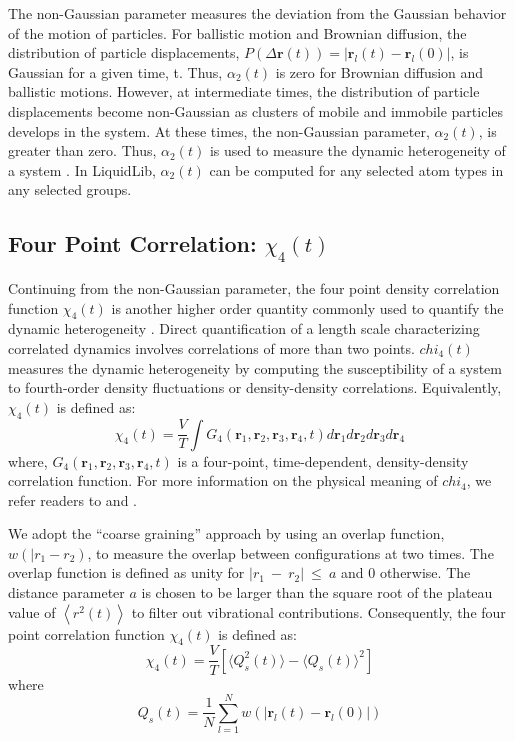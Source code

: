 \documentclass{article}
\begin{document}
The non-Gaussian parameter measures the deviation from the Gaussian behavior of the motion of particles. For ballistic motion and Brownian diffusion, the distribution of particle displacements, $P(\Delta \mathbf{r}(t)) = \left|\mathbf{r}_l(t) - \mathbf{r}_l(0)\right|$, is Gaussian for a given time, t. Thus, $\alpha_2(t)$ is zero for Brownian diffusion and ballistic motions. However, at intermediate times, the distribution of particle displacements become non-Gaussian as clusters of mobile and immobile particles develops in the system. At these times, the non-Gaussian parameter, $\alpha_2(t)$, is greater than zero. Thus, $\alpha_2(t)$ is used to measure the dynamic heterogeneity of a system \cite{Stillinger2005}. In LiquidLib, $\alpha_2(t)$ can be computed for any selected atom types in any selected groups.
 
\subsection{Four Point Correlation: $\chi_4(t)$} \label{sec::chi4}
Continuing from the non-Gaussian parameter, the four point density correlation function $\chi_4(t)$ is another higher order quantity commonly used to quantify the dynamic heterogeneity \cite{chi4}. Direct quantification of a length scale characterizing correlated dynamics involves correlations of more than two points. $chi_4(t)$ measures the dynamic heterogeneity by computing the susceptibility of a system to fourth-order density fluctuations or density-density correlations. Equivalently, $\chi_4(t)$ is defined as:
\begin{equation}
	\chi_4(t) = \frac{V}{T}\int G_4(\mathbf{r}_1, \mathbf{r}_2, \mathbf{r}_3, \mathbf{r}_4, t) d\mathbf{r}_1 d\mathbf{r}_2 d\mathbf{r}_3 d\mathbf{r}_4 
\end{equation}
where, $G_4(\mathbf{r}_1, \mathbf{r}_2, \mathbf{r}_3, \mathbf{r}_4, t)$ is a four-point, time-dependent, density-density correlation function. For more information on the physical meaning of $chi_4$, we refer readers to \cite{chi4} and \cite{Glotzer2000}.

We adopt the ``coarse graining'' approach \cite{chi4} by using an overlap function, $w(|r_1-r_2)$, to measure the overlap between configurations at two times. The overlap function is defined as unity for $|r_1~-~r_2|~\leq~a$ and 0 otherwise. The distance parameter $a$ is chosen to be larger than the square root of the plateau value of $\left<r^2(t)\right>$ to filter out vibrational contributions. Consequently, the four point correlation function $\chi_4(t)$ is defined as:
\begin{equation}
	\label{eq:chi4}
	\chi_4(t) = \frac{V}{T}[\langle Q_s^2(t)\rangle - \langle Q_s(t)\rangle^2]
\end{equation}
where 
\begin{equation}
	\label{eq:Qs}
	Q_s(t) = \frac{1}{N} \sum_{l=1}^N \textit{w}(|\mathbf{r}_l(t) - \mathbf{r}_l(0)|)
\end{equation}
\end{document}
